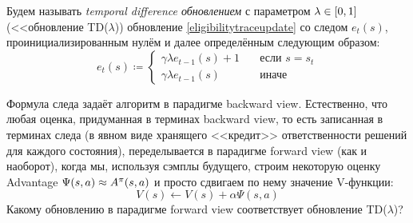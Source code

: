 \begin{definition}
Будем называть \emph{temporal difference обновлением} с параметром $\lambda \HM\in [0, 1]$ (<<обновление TD($\lambda$)) обновление \eqref{eligibilitytraceupdate} со следом $e_t(s)$, проинициализированным нулём и далее определённым следующим образом:
$$e_t(s) \coloneqq \begin{cases}
\gamma \lambda e_{t - 1}(s) + 1 \quad & \text{если } s = s_t \\
\gamma \lambda e_{t - 1}(s) \quad & \text{иначе}
\end{cases}$$
\end{definition}

Формула следа задаёт алгоритм в парадигме backward view. Естественно, что любая оценка, придуманная в терминах backward view, то есть записанная в терминах следа (в явном виде хранящего <<кредит>> ответственности решений для каждого состояния), переделывается в парадигме forward view (как и наоборот), когда мы, используя сэмплы будущего, строим некоторую оценку Advantage $\Psi(s, a) \HM \approx A^\pi(s, a)$ и просто сдвигаем по нему значение V-функции:
\begin{equation}\label{generalforwardviewupdate}
V(s) \leftarrow V(s) + \alpha \Psi(s, a)
\end{equation}
Какому обновлению в парадигме forward view соответствует обновление TD($\lambda$)?

